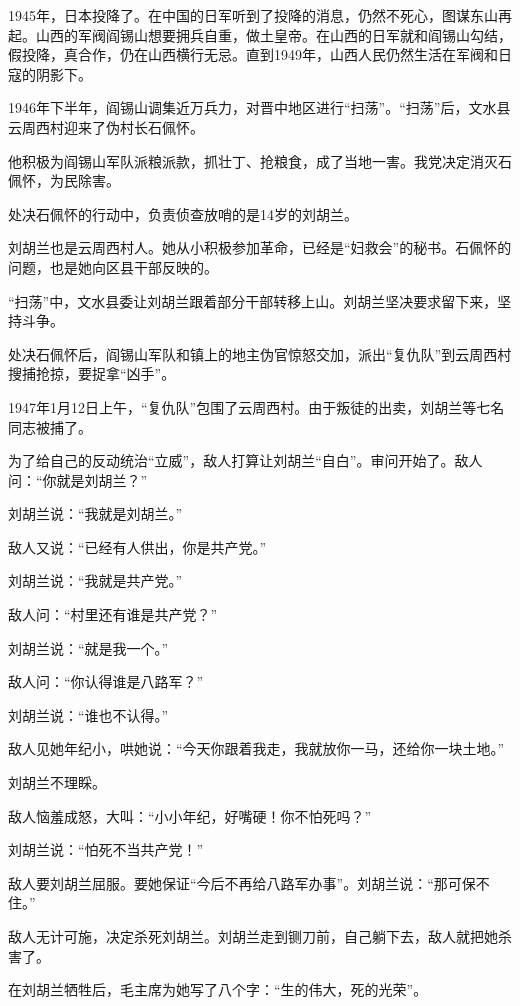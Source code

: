 \documentclass[12pt,UTF-8,openany]{ctexbook}
\begin{document}
\begin{normalsize}
    
    1945年，日本投降了。在中国的日军听到了投降的消息，仍然不死心，图谋东山再起。山西的军阀阎锡山想要拥兵自重，做土皇帝。在山西的日军就和阎锡山勾结，假投降，真合作，仍在山西横行无忌。直到1949年，山西人民仍然生活在军阀和日寇的阴影下。
    
    1946年下半年，阎锡山调集近万兵力，对晋中地区进行“扫荡”。“扫荡”后，文水县云周西村迎来了伪村长石佩怀。
    
    他积极为阎锡山军队派粮派款，抓壮丁、抢粮食，成了当地一害。我党决定消灭石佩怀，为民除害。
    
    处决石佩怀的行动中，负责侦查放哨的是14岁的刘胡兰。
    
    刘胡兰也是云周西村人。她从小积极参加革命，已经是“妇救会”的秘书。石佩怀的问题，也是她向区县干部反映的。
    
    “扫荡”中，文水县委让刘胡兰跟着部分干部转移上山。刘胡兰坚决要求留下来，坚持斗争。
    
    处决石佩怀后，阎锡山军队和镇上的地主伪官惊怒交加，派出“复仇队”到云周西村搜捕抢掠，要捉拿“凶手”。
    
    1947年1月12日上午，“复仇队”包围了云周西村。由于叛徒的出卖，刘胡兰等七名同志被捕了。
    
    为了给自己的反动统治“立威”，敌人打算让刘胡兰“自白”。审问开始了。敌人问：“你就是刘胡兰？”
    
    刘胡兰说：“我就是刘胡兰。”
    
    敌人又说：“已经有人供出，你是共产党。”
    
    刘胡兰说：“我就是共产党。”
    
    敌人问：“村里还有谁是共产党？”
    
    刘胡兰说：“就是我一个。”
    
    敌人问：“你认得谁是八路军？”
    
    刘胡兰说：“谁也不认得。”
    
    敌人见她年纪小，哄她说：“今天你跟着我走，我就放你一马，还给你一块土地。”
    
    刘胡兰不理睬。
    
    敌人恼羞成怒，大叫：“小小年纪，好嘴硬！你不怕死吗？”
    
    刘胡兰说：“怕死不当共产党！”
    
    敌人要刘胡兰屈服。要她保证“今后不再给八路军办事”。刘胡兰说：“那可保不住。”
    
    敌人无计可施，决定杀死刘胡兰。刘胡兰走到铡刀前，自己躺下去，敌人就把她杀害了。
    
    在刘胡兰牺牲后，毛主席为她写了八个字：“生的伟大，死的光荣”。
    
\end{normalsize}
\end{document}
